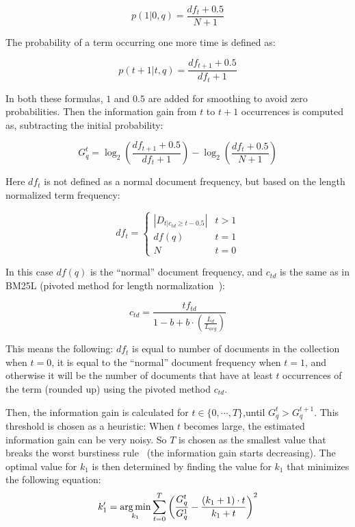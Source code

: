 \begin{equation}
	p(1|0,q) = \frac{df_t+0.5}{N+1}
\end{equation}

The probability of a term occurring one more time is defined as:

\begin{equation}
p(t+1|t,q) = \frac{df_{t+1}+0.5}{df_t+1}
\end{equation}

In both these formulas, $1$ and $0.5$ are added for smoothing to avoid zero probabilities. Then the information gain from $t$ to $t+1$ occurrences is computed as, subtracting the initial probability: 

\begin{equation}
	G^t_q = \log_2\left(\frac{df_{t+1} + 0.5}{df_t+1}\right) - \log_2 \left(\frac{df_{t} + 0.5}{N+1}\right)
\end{equation}

Here $df_t$ is not defined as a normal document frequency, but based on the length normalized term frequency:

\begin{equation}
	df_t = 
	\begin{cases}
		|D_{t|c_{td}\geq t-0.5}| & t > 1\\ 
		df(q) & t = 1\\
		N & t = 0
	\end{cases}
\end{equation}

In this case $df(q)$ is the ``normal'' document frequency, and $c_{td}$ is the same as in BM25L (pivoted method for length normalization~\cite{ctd}):

\begin{equation}
	c_{td} = \frac{tf_{td}}{1-b+b\cdot\left(\frac{L_d}{L_{avg}}\right)}
\end{equation}

This means the following: $df_t$ is equal to number of documents in the collection when $t = 0$, it is equal to the ``normal'' document frequency when $t = 1$, and otherwise it will be the number of documents that have at least $t$ occurrences of the term (rounded up) using the pivoted method $c_{td}$. 

Then, the information gain is calculated for $t \in \{0,\cdots,T\}$,until $G^t_q > G^{t+1}_q$. This threshold is chosen as a heuristic: When $t$ becomes large, the estimated information gain can be very noisy. So $T$ is chosen as the smallest value that breaks the worst burstiness rule~\cite{burstiness_rule} (the information gain starts decreasing). The optimal value for $k_1$ is then determined by finding the value for $k_1$ that minimizes the following equation:
\begin{equation}
	k'_1 = \operatorname*{arg\,min}_{k_1} \sum_{t=0}^{T}\left(\frac{G^t_q}{G^1_q} - \frac{(k_1+1)\cdot t}{k_1+t}\right)^2
\end{equation}

